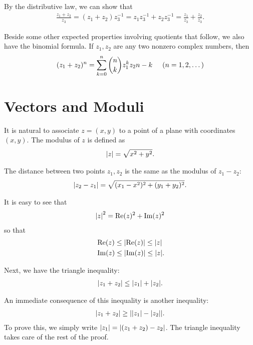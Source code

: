 \documentclass{book}
\theoremstyle{definition}
\newcommand{\f}[2]{\frac{#1}{#2}}
\begin{document}
By the distributive law, we can show that
\begin{align}
\f{z_1 + z_2}{z_3} = (z_1 + z_2)z_3^{-1} = z_1z_3^{-1} + z_2z_3^{-1}  =\f{z_1}{z_3} + \f{z_2}{z_3}.
\end{align}

Beside some other expected properties involving quotients that follow, we also have the binomial formula. If $z_1, z_2$ are any two nonzero complex numbers, then
\begin{align}
(z_1 + z_2)^{n} = \sum^{n}_{k=0} {n\choose k} z_1^{k}z_2{n-k} \hspace{0.5cm} (n=1,2,\dots)
\end{align}







\section{Vectors and Moduli}

It is natural to associate $z = (x,y)$ to a point of a plane with coordinates $(x,y)$. The modulus of $z$ is defined as 
\begin{align}
\abs{z} = \sqrt{x^2 + y^2}.
\end{align}

The distance between two points $z_1, z_2$ is the same as the modulus of $z_1 - z_2$:
\begin{align}
\abs{z_2 - z_1} = \sqrt{(x_1 - x^2)^2 + (y_1 + y_2)^2}.
\end{align}

It is easy to see that 
\begin{align}
\abs{z}^2 = \Re(z)^2 + \Im(z)^2
\end{align}
so that
\begin{align}
&\Re(z) \leq \abs{\Re(z)} \leq \abs{z}\\
&\Im(z) \leq \abs{\Im(z)} \leq \abs{z}.
\end{align}


Next, we have the triangle inequality:
\begin{align}
\abs{z_1 + z_2} \leq \abs{z_1} + \abs{z_2}.
\end{align}

An immediate consequence of this inequality is another inequality:
\begin{align}
\abs{z_1 + z_2} \geq \abs{\abs{z_1} - \abs{z_2}}.
\end{align}
To prove this, we simply write $\abs{z_1} = \abs{(z_1 + z_2) - z_2}$. The triangle inequality takes care of the rest of the proof. \\
\end{document}
